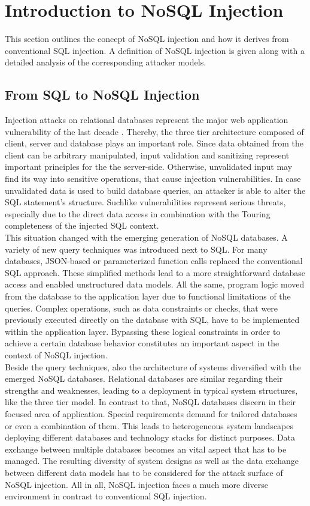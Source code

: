 \chapter{Introduction to NoSQL Injection}
This section outlines the concept of NoSQL injection and how it derives from conventional SQL injection. A definition of NoSQL injection is given along with a detailed analysis of the corresponding attacker models.

\section{From SQL to NoSQL Injection}
\label{sec:fromSQLtoNoSQLinjection}
Injection attacks on relational databases represent the major web application vulnerability of the last decade \cite{OWASP:2013b}. Thereby, the three tier architecture composed of client, server and database plays an important role. Since data obtained from the client can be arbitrary manipulated, input validation and sanitizing represent important principles for the the server-side. Otherwise, unvalidated input may find its way into sensitive operations, that cause injection vulnerabilities. In case unvalidated data is used to build database queries, an attacker is able to alter the SQL statement's structure. Suchlike vulnerabilities represent serious threats, especially due to the direct data access in combination with the Touring completeness of the injected SQL context.\\ 

This situation changed with the emerging generation of NoSQL databases. A variety of new query techniques was introduced next to SQL. For many databases, JSON-based or parameterized function calls replaced the conventional SQL approach. These simplified methods lead to a more straightforward database access and enabled unstructured data models. All the same, program logic moved from the database to the application layer due to functional limitations of the queries. Complex operations, such as data constraints or checks, that were previously executed directly on the database with SQL, have to be implemented within the application layer. Bypassing these logical constraints in order to achieve a certain database behavior constitutes an important aspect in the context of NoSQL injection. \\ 

Beside the query techniques, also the architecture of systems diversified with the emerged NoSQL databases. Relational databases are similar regarding their strengths and weaknesses, leading to a deployment in typical system structures, like the three tier model. In contrast to that, NoSQL databases discern in their focused area of application. Special requirements demand for tailored databases or even a combination of them. This leads to heterogeneous system landscapes deploying different databases and technology stacks for distinct purposes. Data exchange between multiple databases becomes an vital aspect that has to be managed. The resulting diversity of system designs as well as the data exchange between different data models has to be considered for the attack surface of NoSQL injection. All in all, NoSQL injection faces a much more diverse environment in contrast to conventional SQL injection.

